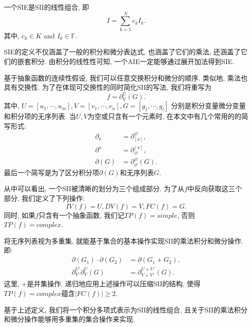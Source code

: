 \begin{definition}
一个SIE是SII的线性组合, 即
\begin{equation}
I = \sum_{k=1}^N{c_k I_k}.
\label{std_form}
\end{equation} 
其中, $c_k \in K$ and $I_k \in \mathbb F$. 
\end{definition}

SIE的定义不仅涵盖了一般的积分和微分表达式, 也涵盖了它们的乘法, 还涵盖了它们的嵌套积分. 由积分的线性性可知, 一个AIE一定能够通过展开加法得到SIE.

基于抽象函数的连续性假设, 我们可以任意交换积分和微分的顺序. 类似地, 乘法也具有交换性. 为了在体现可交换性的同时简化SII的写法, 我们将重写为
\begin{equation} 
f=\partial^U_V(G). \label{st_form}
\end{equation} 
其中,  $U=[u_1,\cdots,u_m], V=[v_1,\cdots,v_n], G=[g_1,\cdots,g_l]$ 分别是积分变量\D 微分变量和积分项的无序列表. 当$U,V$为空或只含有一个元素时, 在本文中有几个常用的的简写形式:
\begin{equation}
\begin{split}
\partial_x&=\partial^\varnothing_{[x]},  \\
\partial^x&=\partial_\varnothing^{[x]},  \\ 
\partial(G)&=\partial^\varnothing_\varnothing(G).
\end{split}
\end{equation}
最后一个简写是为了区分积分项$\partial(G)$和无序列表$G$. 

从中可以看出, 一个SII被清晰的划分为三个组成部分. 为了从$f$中反向获取这三个部分, 我们定义了下列操作:
\begin{equation}
IV(f)=U,DV(f)=V,FC(f)=G.
\end{equation}
同时, 如果$f$只含有一个抽象函数, 我们记$TP(f)=simple$, 否则$TP(f)=complex$. 

将无序列表视为多重集, 就能基于集合的基本操作实现SII的乘法\D 积分和微分操作. 即:
\begin{equation}
\begin{split}
\partial(G_1)\cdot\partial(G_2)&=\partial(G_1+G_2),\\
\partial^{U'}_{V'}\partial^{U}_{V}(G)&=\partial^{U+U'}_{V+V'}(G).
\end{split}
\label{ops}
\end{equation}
这里, $+$是并集操作. 递归地应用上述操作可以压缩SII的结构, 使得$TP(f)=complex$蕴含$|FC(f)|\ge 2$. 

基于上述定义, 我们将一个积分多项式表示为SII的线性组合, 且关于SII的乘法\D 积分和微分操作能够用多重集的集合操作来实现. 

